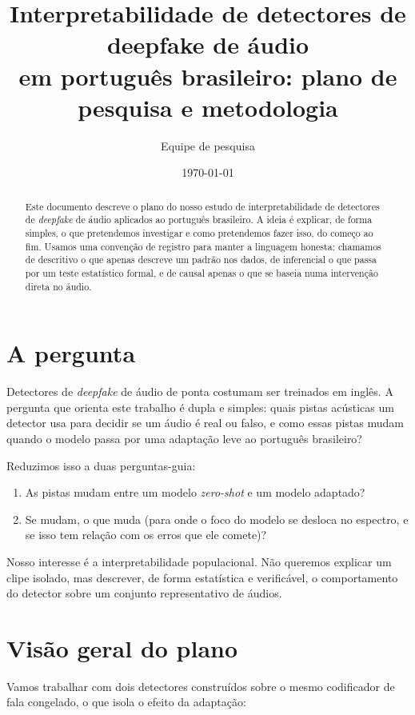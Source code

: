 \documentclass[11pt,a4paper]{article}
\title{\textbf{Interpretabilidade de detectores de deepfake de áudio\\
em português brasileiro: plano de pesquisa e metodologia}}
\author{Equipe de pesquisa}
\date{\today}
\begin{document}
\maketitle

\begin{abstract}
\noindent
Este documento descreve o plano do nosso estudo de interpretabilidade de
detectores de \emph{deepfake} de áudio aplicados ao português brasileiro. A ideia
é explicar, de forma simples, o que pretendemos investigar e como pretendemos
fazer isso, do começo ao fim. Usamos uma convenção de registro para manter a
linguagem honesta: chamamos de descritivo o que apenas descreve um padrão nos
dados, de inferencial o que passa por um teste estatístico formal, e de causal
apenas o que se baseia numa intervenção direta no áudio.
\end{abstract}

\section{A pergunta}

Detectores de \emph{deepfake} de áudio de ponta costumam ser treinados em inglês.
A pergunta que orienta este trabalho é dupla e simples: quais pistas acústicas um
detector usa para decidir se um áudio é real ou falso, e como essas pistas mudam
quando o modelo passa por uma adaptação leve ao português brasileiro?

Reduzimos isso a duas perguntas-guia:

\begin{enumerate}[label=\textbf{Q\arabic*.}]
  \item As pistas mudam entre um modelo \emph{zero-shot} e um modelo adaptado?
  \item Se mudam, o que muda (para onde o foco do modelo se desloca no espectro, e
        se isso tem relação com os erros que ele comete)?
\end{enumerate}

Nosso interesse é a interpretabilidade populacional. Não queremos explicar um
clipe isolado, mas descrever, de forma estatística e verificável, o comportamento
do detector sobre um conjunto representativo de áudios.

\section{Visão geral do plano}

Vamos trabalhar com dois detectores construídos sobre o mesmo codificador de fala
congelado, o que isola o efeito da adaptação:
\end{document}
